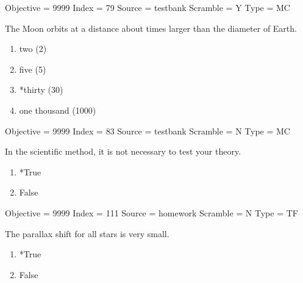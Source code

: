 \documentclass[11pt]{article}
\begin{document}
\begin{enumerate}
\begin{minipage}{\textwidth}
\begin{minipage}{\textwidth}
Objective = 9999
Index = 79
Source = testbank
Scramble = Y
Type = MC
\end{minipage}
\end{minipage}
\vskip 0.20in

\begin{minipage}{\textwidth}
\begin{minipage}{\textwidth}
\item The Moon orbits at a distance about \underline{\hspace{0.5in}} times larger than the diameter of Earth.
\begin{multicols}{3}
\begin{enumerate} 
\setlength{\itemsep}{1pt} 
\setlength{\parskip}{0pt} 
\setlength{\parsep}{0pt}
\setlength{\multicolsep}{1pt} 
\item two (2)
\item five (5)
\item *thirty (30)
\item one thousand (1000)
\end{enumerate} 
\vfill 
\end{multicols}

Objective = 9999
Index = 83
Source = testbank
Scramble = N
Type = MC
\end{minipage}
\end{minipage}
\vskip 0.20in

\begin{minipage}{\textwidth}
\begin{minipage}{\textwidth}
\item In the scientific method, it is not necessary to test your theory.
\begin{multicols}{3}
\begin{enumerate} 
\setlength{\itemsep}{1pt} 
\setlength{\parskip}{0pt} 
\setlength{\parsep}{0pt}
\setlength{\multicolsep}{1pt} 
\item *True
\item False
\end{enumerate} 
\vfill 
\end{multicols}

Objective = 9999
Index = 111
Source = homework
Scramble = N
Type = TF
\end{minipage}
\end{minipage}
\vskip 0.20in

\begin{minipage}{\textwidth}
\begin{minipage}{\textwidth}
\item The parallax shift for all stars is very small.
\begin{multicols}{3}
\begin{enumerate} 
\setlength{\itemsep}{1pt} 
\setlength{\parskip}{0pt} 
\setlength{\parsep}{0pt}
\setlength{\multicolsep}{1pt} 
\item *True
\item False
\end{enumerate} 
\vfill 
\end{multicols}


\end{minipage}
\end{minipage}
\end{enumerate}
\end{document}
